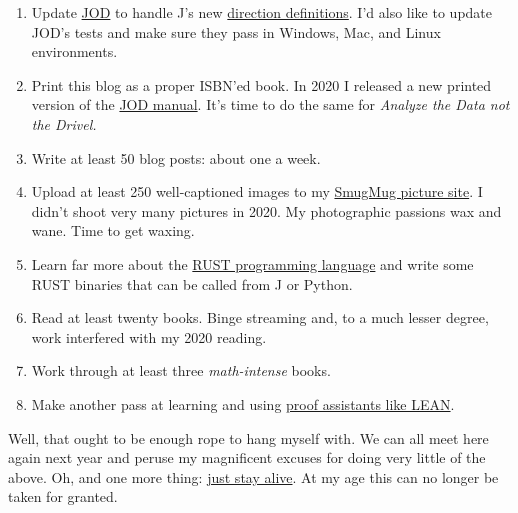 \begin{enumerate}
\def\labelenumi{\arabic{enumi}.}
\tightlist
\item
  Update
  \href{https://analyzethedatanotthedrivel.org/the-jod-page/}{JOD} to
  handle J's new
  \href{https://code.jsoftware.com/wiki/Vocabulary/DirectDefinition}{direction
  definitions}. I'd also like to update JOD's tests and make sure they
  pass in Windows, Mac, and Linux environments.
\item
  Print this blog as a proper ISBN'ed book. In 2020 I released a new
  printed version of the \href{https://www.amazon.com/dp/B08M2KBMND}{JOD
  manual}. It's time to do the same for \emph{Analyze the Data not the
  Drivel.}
\item
  Write at least 50 blog posts: about one a week.
\item
  Upload at least 250 well-captioned images to my
  \href{https://conceptcontrol.smugmug.com/}{SmugMug picture site}. I
  didn't shoot very many pictures in 2020. My photographic passions wax
  and wane. Time to get waxing.
\item
  Learn far more about the \href{https://www.rust-lang.org/}{RUST
  programming language} and write some RUST binaries that can be called
  from J or Python.
\item
  Read at least twenty books. Binge streaming and, to a much lesser
  degree, work interfered with my 2020 reading.
\item
  Work through at least three \emph{math-intense} books.
\item
  Make another pass at learning and using
  \href{https://leanprover.github.io/}{proof assistants like LEAN}.
\end{enumerate}

Well, that ought to be enough rope to hang myself with. We can all meet
here again next year and peruse my magnificent excuses for doing very
little of the above. Oh, and one more thing:
\href{https://www.youtube.com/watch?v=I_izvAbhExY}{just stay alive}. At
my age this can no longer be taken for granted.



%
 

